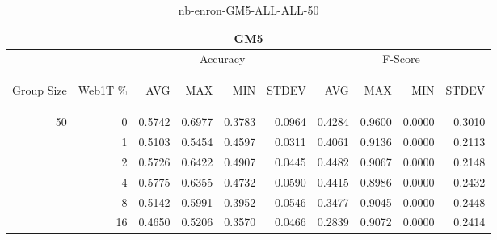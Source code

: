 \begin{center}
\begin{table}[htbp]
\begin{tabular}{ | r | r | r | r | r | r | r | r | r | r |}
\hline
\multicolumn{10}{|c|}{GM5}\\
\hline
 & & \multicolumn{4}{|c|}{Accuracy} & \multicolumn{4}{|c|}{F-Score}\\ \cline{3-10}
\begin{sideways}Group Size\end{sideways} & \begin{sideways}Web1T \%\end{sideways} & \begin{sideways}AVG\end{sideways} & \begin{sideways}MAX\end{sideways} & \begin{sideways}MIN\end{sideways} & \begin{sideways}STDEV\end{sideways} & \begin{sideways}AVG\end{sideways} & \begin{sideways}MAX\end{sideways} & \begin{sideways}MIN\end{sideways} & \begin{sideways}STDEV\end{sideways}\\
\hline
\multirow{6}{*}{50}
 & 0 & 0.5742 & 0.6977 & 0.3783 & 0.0964 & 0.4284 & 0.9600 & 0.0000 & 0.3010\\ \cline{2-10}
 & 1 & 0.5103 & 0.5454 & 0.4597 & 0.0311 & 0.4061 & 0.9136 & 0.0000 & 0.2113\\ \cline{2-10}
 & 2 & 0.5726 & 0.6422 & 0.4907 & 0.0445 & 0.4482 & 0.9067 & 0.0000 & 0.2148\\ \cline{2-10}
 & 4 & 0.5775 & 0.6355 & 0.4732 & 0.0590 & 0.4415 & 0.8986 & 0.0000 & 0.2432\\ \cline{2-10}
 & 8 & 0.5142 & 0.5991 & 0.3952 & 0.0546 & 0.3477 & 0.9045 & 0.0000 & 0.2448\\ \cline{2-10}
 & 16 & 0.4650 & 0.5206 & 0.3570 & 0.0466 & 0.2839 & 0.9072 & 0.0000 & 0.2414\\ \cline{2-10}
\hline
\end{tabular}
\caption{nb-enron-GM5-ALL-ALL-50}
\end{table}
\end{center}

